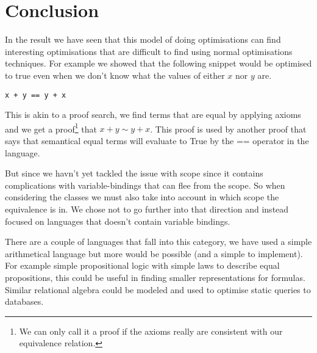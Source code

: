 
\section{Conclusion}
In the result we have seen that this model of doing optimisations can find interesting
optimisations that are difficult to find using normal optimisations techniques\cite{santos}.
For example we showed that the following snippet would be optimised to true even
when we don't know what the values of either $x$ nor $y$ are.

\begin{verbatim}
x + y == y + x
\end{verbatim}

This is akin to a proof search, we find terms that are equal by applying axioms
and we get a proof\footnote{We can only call it a proof if the axioms really are 
consistent with our equivalence relation.} that $x + y \sim y + x$. This proof
is used by another proof that says that semantical equal terms will evaluate to 
True by the == operator in the language.

But since we havn't yet tackled the issue with scope since it contains complications
with variable-bindings that can flee from the scope. So when considering the classes
we must also take into account in which scope the equivalence is in. We chose not
to go further into that direction and instead focused on languages that doesn't
contain variable bindings.

There are a couple of languages that fall into this category, we have used a simple
arithmetical language but more would be possible (and a simple to implement). For
example simple propositional logic with simple laws to describe equal propositions,
this could be useful in finding smaller representations for formulas. Similar
relational algebra could be modeled and used to optimise static queries to databases.

 